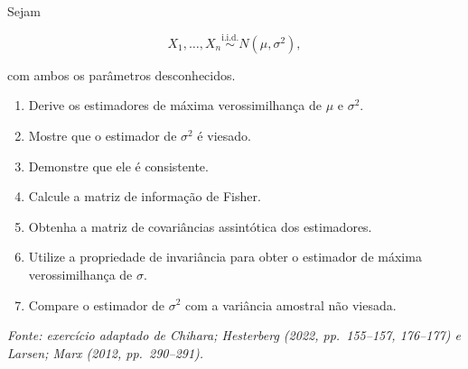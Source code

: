 \documentclass[
  letterpaper,
  DIV=11,
  numbers=noendperiod]{scrreprt}
\providecommand{\tightlist}{%
  \setlength{\itemsep}{0pt}\setlength{\parskip}{0pt}}\usepackage{longtable,booktabs,array}
\begin{document}
\begin{tcolorbox}[enhanced jigsaw, colback=white, leftrule=.75mm, colbacktitle=quarto-callout-tip-color!10!white, breakable, titlerule=0mm, bottomtitle=1mm, title=\textcolor{quarto-callout-tip-color}{\faLightbulb}\hspace{0.5em}{Exercício 5 --- Modelo normal}, colframe=quarto-callout-tip-color-frame, toprule=.15mm, opacityback=0, bottomrule=.15mm, opacitybacktitle=0.6, arc=.35mm, toptitle=1mm, rightrule=.15mm, coltitle=black, left=2mm]

Sejam

\[X_1,\ldots,X_n
\overset{\mathrm{i.i.d.}}{\sim}
N(\mu,\sigma^2),\]

com ambos os parâmetros desconhecidos.

\begin{enumerate}
\def\labelenumi{\arabic{enumi}.}
\tightlist
\item
  Derive os estimadores de máxima verossimilhança de \(\mu\) e
  \(\sigma^2\).
\item
  Mostre que o estimador de \(\sigma^2\) é viesado.
\item
  Demonstre que ele é consistente.
\item
  Calcule a matriz de informação de Fisher.
\item
  Obtenha a matriz de covariâncias assintótica dos estimadores.
\item
  Utilize a propriedade de invariância para obter o estimador de máxima
  verossimilhança de \(\sigma\).
\item
  Compare o estimador de \(\sigma^2\) com a variância amostral não
  viesada.
\end{enumerate}

\emph{Fonte: exercício adaptado de Chihara; Hesterberg (2022,
pp.~155--157, 176--177) e Larsen; Marx (2012, pp.~290--291).}

\end{tcolorbox}
\end{document}
